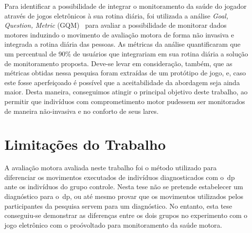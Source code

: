 Para identificar a possibilidade de integrar o monitoramento da saúde do jogador através de jogos eletrônicos à sua rotina diária, foi utilizada a análise \textit{Goal, Question, Metric} (GQM)~\cite{basili94} para avaliar a possibilidade de monitorar dados motores induzindo o movimento de avaliação motora de forma não invasiva e integrada a rotina diária das pessoas. As métricas da análise quantificaram que um percentual de 90\% de usuários que integrariam em sua rotina diária a solução de monitoramento proposta. Deve-se levar em consideração, também, que as métricas obtidas nessa pesquisa foram extraídas de um protótipo de jogo, e, caso este fosse aperfeiçoado é possível que a aceitabilidade da abordagem seja ainda maior. Desta maneira, conseguimos atingir o principal objetivo deste trabalho, ao permitir que indivíduos com comprometimento motor pudessem ser monitorados de maneira não-invasiva e no conforto de seus lares.






\section{Limitações do Trabalho}\label{section:limitacoes}
A avaliação motora avaliada neste trabalho foi o método utilizado para diferenciar os movimentos executados de indivíduos diagnosticados com o~\ac{dp} ante os indivíduos do grupo controle. Nesta tese não se pretende estabelecer um diagnóstico para o~\ac{dp}, ou até mesmo provar que os movimentos utilizados pelos participantes da pesquisa servem para um diagnóstico. No entanto, esta tese conseguiu-se demonstrar as diferenças entre os dois grupos no experimento com o jogo eletrônico com o proóvoltado para monitoramento da saúde motora.

